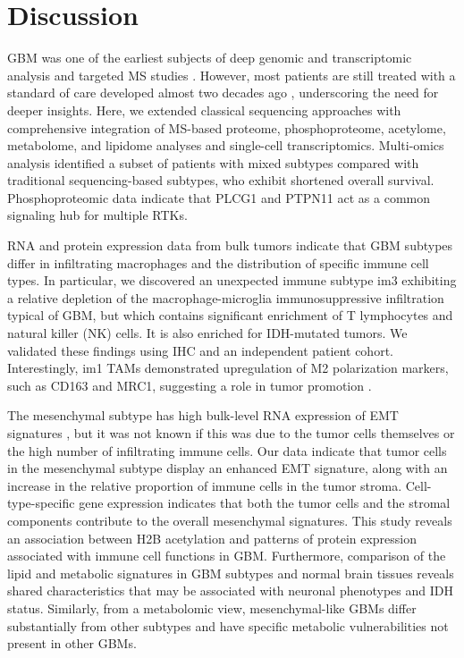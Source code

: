 \section{Discussion}
GBM was one of the earliest subjects of deep genomic and transcriptomic analysis \cite{brennancw_chinl:GBM2013} and targeted MS studies \cite{gux_liz:ProteomeAcetylome2017,heh_emmettmr:MethodLipidomic2007}. However, most patients are still treated with a standard of care developed almost two decades ago \cite{stuppr_mirimanoffro:RadiotherapyConcomitant2005}, underscoring the need for deeper insights. Here, we extended classical sequencing approaches with comprehensive integration of MS-based proteome, phosphoproteome, acetylome, metabolome, and lipidome analyses and single-cell transcriptomics. Multi-omics analysis identified a subset of patients with mixed subtypes compared with traditional sequencing-based subtypes, who exhibit shortened overall survival. Phosphoproteomic data indicate that PLCG1 and PTPN11 act as a common signaling hub for multiple RTKs.

RNA and protein expression data from bulk tumors indicate that GBM subtypes differ in infiltrating macrophages and the distribution of specific immune cell types. In particular, we discovered an unexpected immune subtype im3 exhibiting a relative depletion of the macrophage-microglia immunosuppressive infiltration typical of GBM, but which contains significant enrichment of T lymphocytes and natural killer (NK) cells. It is also enriched for IDH-mutated tumors. We validated these findings using IHC and an independent patient cohort. Interestingly, im1 TAMs demonstrated upregulation of M2 polarization markers, such as CD163 and MRC1, suggesting a role in tumor promotion \cite{pintoml_oliveiramj:TwoFaces2019}.

The mesenchymal subtype has high bulk-level RNA expression of EMT signatures \cite{behnanj_hannag:LandscapeMesenchymal2019}, but it was not known if this was due to the tumor cells themselves or the high number of infiltrating immune cells. Our data indicate that tumor cells in the mesenchymal subtype display an enhanced EMT signature, along with an increase in the relative proportion of immune cells in the tumor stroma. Cell-type-specific gene expression indicates that both the tumor cells and the stromal components contribute to the overall mesenchymal signatures. This study reveals an association between H2B acetylation and patterns of protein expression associated with immune cell functions in GBM. Furthermore, comparison of the lipid and metabolic signatures in GBM subtypes and normal brain tissues reveals shared characteristics that may be associated with neuronal phenotypes and IDH status. Similarly, from a metabolomic view, mesenchymal-like GBMs differ substantially from other subtypes and have specific metabolic vulnerabilities not present in other GBMs.

